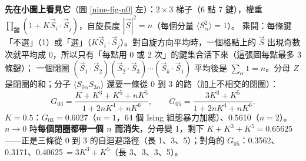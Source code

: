\textbf{先在小圖上看見它}（圖 \ref{nine-fig-n0} 左）：$2\times3$ 梯子（6 點 7 鍵），權重 $\prod_{\text{鍵}}(1+K\vec S_i\cdot\vec S_j)$，自旋長度 $|\vec S|^2=n$（每個分量 $\langle S_\alpha^2\rangle=1$）。
乘開：每條鍵「不選」（1）或「選」（$K\vec S_i\cdot\vec S_j$）。對自旋方向平均時，一個格點上的 $\vec S$ 出現奇數次就平均成 0，所以只有「每點用 0 或 2 次」的鍵集合活下來（這張圖每點最多 3 條鍵）；
一個閉圈 $(\vec S_1\cdot\vec S_2)(\vec S_2\cdot\vec S_3)\cdots(\vec S_k\cdot\vec S_1)$ 平均後是 $\sum_\alpha1=n$。分母 $Z$ 是閉圈的和；分子 $\langle S_{0\alpha}S_{3\alpha}\rangle$ 還要一條從 0 到 3 的路（加上不相交的閉圈）：
\[G_{03}=\frac{K+K^3+K^5+nK^5}{1+2nK^4+nK^6},\qquad G_{05}=\frac{3K^3+K^5}{1+2nK^4+nK^6}.\]
$K=0.5$：$G_{03}=0.6027$（$n=1$，64 個 Ising 組態暴力加總）、0.5610（$n=2$）。$n\to0$ 時\textbf{每個閉圈都帶一個 $n$ 而消失}，分母變 1，剩下 $K+K^3+K^5=0.65625$
——正是三條從 0 到 3 的自迴避路徑（長 1、3、5）；對角的 $G_{05}$：0.3562、0.3171、0.40625$\,=3K^3+K^5$（長 3、3、3、5）。

